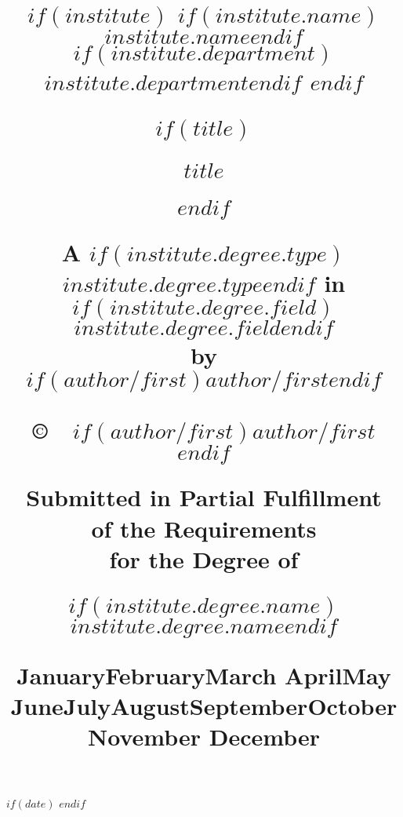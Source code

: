 \usepackage{advdate}
$if(date)$
\SetDate[$date$]
\FixDate
$endif$

\newcommand{\longmonth}{
    \ifcase \the\month \or January\or February\or March\or %
        April\or May \or June\or July\or August\or September\or October\or November\or %
        December
    \fi
}

\title{
    \normalsize
    \vspace*{-0.25in}
    \begin{center}
        $if(institute)$
        $if(institute.name)$$institute.name$$endif$\\
        $if(institute.department)$$institute.department$$endif$
        $endif$

        \vfill


        $if(title)$
        \begin{doublespace}
            \bfseries\uppercase\expandafter{$title$}
        \end{doublespace}
        $endif$

        \vfill

        A $if(institute.degree.type)$$institute.degree.type$$endif$ in\\
        $if(institute.degree.field)$$institute.degree.field$$endif$\\
        by\\
        $if(author/first)$$author/first$$endif$

        \vfill

        \copyright\ \the\year~$if(author/first)$$author/first$$endif$

        \vfill

        Submitted in Partial Fulfillment\\
        of the Requirements\\
        for the Degree of

        \vfill

        $if(institute.degree.name)$$institute.degree.name$$endif$

        \vfill

        \longmonth \the\year
    \end{center}
}

\date{ }
